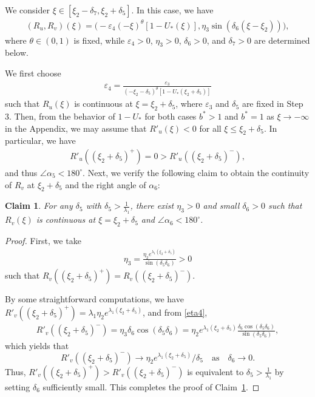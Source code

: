 \documentclass[11pt,a4paper]{article}
\newtheorem{claim}[theorem]{\textbf{Claim}}
\numberwithin{equation}{section}
\numberwithin{figure}{section}
\newcommand{\blue}[1]{{\color{blue}#1}}
\newcommand\bea{\begin{eqnarray}}
\newcommand\eea{\end{eqnarray}}
\newcommand\beaa{\begin{eqnarray*}}
\newcommand\eeaa{\end{eqnarray*}}
\begin{document}
\medskip

 We consider $\xi\in[\xi_2-\delta_7,\xi_2+\delta_5]$.
In this case, we have
\beaa
(R_u,R_v)(\xi)=\Big(-\varepsilon_4(-\xi)^{\theta}[1-U_*(\xi)],\eta_3\sin(\delta_6(\xi-\xi_2))\Big),
\eeaa
where $\theta\in(0,1)$ is fixed,
while $\varepsilon_4>0$, $\eta_3>0$,
$\delta_6>0$, and $\delta_7>0$ are determined below.



We first choose
\bea\label{epsilon4}
\varepsilon_4=\frac{\varepsilon_3}{(-\xi_2-\delta_5)^{\theta}[1-U_*(\xi_2+\delta_5)]}
\eea
such that $R_u(\xi)$ is continuous at $\xi=\xi_2+\delta_5$,
where $\varepsilon_3$ and $\delta_5$ are fixed in Step 3.
Then, from the behavior of $1-U_*$ for both cases $b^*>1$ and $b^*=1$ as $\xi\to-\infty$ in the Appendix, we may assume that $R'_u(\xi)<0$ for all $\xi\leq \xi_2+\delta_5$. In particular,
we have
\beaa
R'_u((\xi_2+\delta_5)^+)=0>R'_u((\xi_2+\delta_5)^-),
\eeaa
and thus $\angle\alpha_5<180^{\circ}$.
Next, we verify the following claim to obtain the continuity of $R_v$ at $\xi_2+\delta_5$ and the right angle of $\alpha_6$:
\begin{claim}\label{cl 5}
For any $\delta_5$ with $\delta_5>\frac{1}{\lambda_1}$, there exist
$\eta_3>0$ and small $\delta_6>0$
such that $R_v(\xi)$ is continuous at $\xi=\xi_2+\delta_5$ and $\angle\alpha_6<180^{\circ}$.
\end{claim}
\begin{proof}
First, we  take
\bea\label{eta4}
\eta_3= \frac{\eta_2e^{\lambda_1(\xi_2+\delta_5)}}{\sin(\delta_5\delta_6)}>0
\eea
such that $R_v((\xi_2+\delta_5)^+)=R_v((\xi_2+\delta_5)^-)$.

By some straightforward computations, we have
$R'_v((\xi_2+\delta_5)^+)=\lambda_1\eta_2e^{\lambda_1(\xi_2+\delta_5)}$, and from \eqref{eta4},
\beaa
R'_v((\xi_2+\delta_5)^-)=\eta_3\delta_6\cos(\delta_5\delta_6)=\eta_2e^{\lambda_1(\xi_2+\delta_5)}\frac{\delta_6\cos(\delta_5\delta_6)}{\sin(\delta_5\delta_6)},
\eeaa
which yields that
$$R'_v((\xi_2+\delta_5)^-)\rightarrow \eta_2e^{\lambda_1(\xi_2+\delta_5)}/\delta_5\quad\text{as}\quad \delta_6\to0.$$
Thus, $R'_v((\xi_2+\delta_5)^+)>R'_v((\xi_2+\delta_5)^-)$ is equivalent to $\delta_5>\frac{1}{\lambda_1}$ by setting $\delta_6$ sufficiently small.
This completes the proof of Claim~\ref{cl 5}.
\end{proof}
\end{document}
